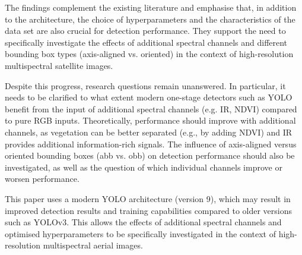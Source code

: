 The findings complement the existing literature and emphasise that, in addition to the architecture, the choice of hyperparameters and the characteristics of the data set are also crucial for detection performance. They support the need to specifically investigate the effects of additional spectral channels and different bounding box types (axis-aligned vs. oriented) in the context of high-resolution multispectral satellite images.

Despite this progress, research questions remain unanswered. In particular, it needs to be clarified to what extent modern one-stage detectors such as \acrshort{YOLO} benefit from the input of additional spectral channels (e.g. \Acrfull{IR}, \acrshort{NDVI}) compared to pure \acrshort{RGB} inputs. Theoretically, performance should improve with additional channels, as vegetation can be better separated (e.g., by adding \acrshort{NDVI}) and \acrshort{IR} provides additional information-rich signals. The influence of axis-aligned versus oriented bounding boxes (\acrshort{abb} vs. \acrshort{obb}) on detection performance should also be investigated, as well as the question of which individual channels improve or worsen performance.
  
This paper uses a modern \acrshort{YOLO} architecture (version 9), which may result in improved detection results and training capabilities compared to older versions such as YOLOv3. This allows the effects of additional spectral channels and optimised hyperparameters to be specifically investigated in the context of high-resolution multispectral aerial images.



